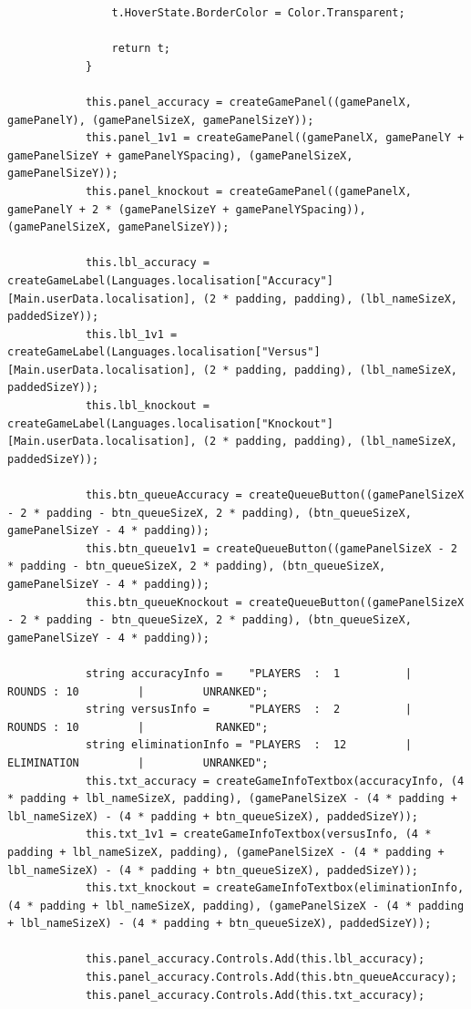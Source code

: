 \documentclass{article}
\begin{document}
\begin{verbatim}
				t.HoverState.BorderColor = Color.Transparent;

				return t;
			}

			this.panel_accuracy = createGamePanel((gamePanelX, gamePanelY), (gamePanelSizeX, gamePanelSizeY));
			this.panel_1v1 = createGamePanel((gamePanelX, gamePanelY + gamePanelSizeY + gamePanelYSpacing), (gamePanelSizeX, gamePanelSizeY));
			this.panel_knockout = createGamePanel((gamePanelX, gamePanelY + 2 * (gamePanelSizeY + gamePanelYSpacing)), (gamePanelSizeX, gamePanelSizeY));

			this.lbl_accuracy = createGameLabel(Languages.localisation["Accuracy"][Main.userData.localisation], (2 * padding, padding), (lbl_nameSizeX, paddedSizeY));
			this.lbl_1v1 = createGameLabel(Languages.localisation["Versus"][Main.userData.localisation], (2 * padding, padding), (lbl_nameSizeX, paddedSizeY));
			this.lbl_knockout = createGameLabel(Languages.localisation["Knockout"][Main.userData.localisation], (2 * padding, padding), (lbl_nameSizeX, paddedSizeY));

			this.btn_queueAccuracy = createQueueButton((gamePanelSizeX - 2 * padding - btn_queueSizeX, 2 * padding), (btn_queueSizeX, gamePanelSizeY - 4 * padding));
			this.btn_queue1v1 = createQueueButton((gamePanelSizeX - 2 * padding - btn_queueSizeX, 2 * padding), (btn_queueSizeX, gamePanelSizeY - 4 * padding));
			this.btn_queueKnockout = createQueueButton((gamePanelSizeX - 2 * padding - btn_queueSizeX, 2 * padding), (btn_queueSizeX, gamePanelSizeY - 4 * padding));

			string accuracyInfo =    "PLAYERS  :  1          |         ROUNDS : 10         |         UNRANKED";
			string versusInfo =      "PLAYERS  :  2          |         ROUNDS : 10         |           RANKED";
			string eliminationInfo = "PLAYERS  :  12         |         ELIMINATION         |         UNRANKED";
			this.txt_accuracy = createGameInfoTextbox(accuracyInfo, (4 * padding + lbl_nameSizeX, padding), (gamePanelSizeX - (4 * padding + lbl_nameSizeX) - (4 * padding + btn_queueSizeX), paddedSizeY));
			this.txt_1v1 = createGameInfoTextbox(versusInfo, (4 * padding + lbl_nameSizeX, padding), (gamePanelSizeX - (4 * padding + lbl_nameSizeX) - (4 * padding + btn_queueSizeX), paddedSizeY));
			this.txt_knockout = createGameInfoTextbox(eliminationInfo, (4 * padding + lbl_nameSizeX, padding), (gamePanelSizeX - (4 * padding + lbl_nameSizeX) - (4 * padding + btn_queueSizeX), paddedSizeY));

			this.panel_accuracy.Controls.Add(this.lbl_accuracy);
			this.panel_accuracy.Controls.Add(this.btn_queueAccuracy);
			this.panel_accuracy.Controls.Add(this.txt_accuracy);


\end{verbatim}
\end{document}
